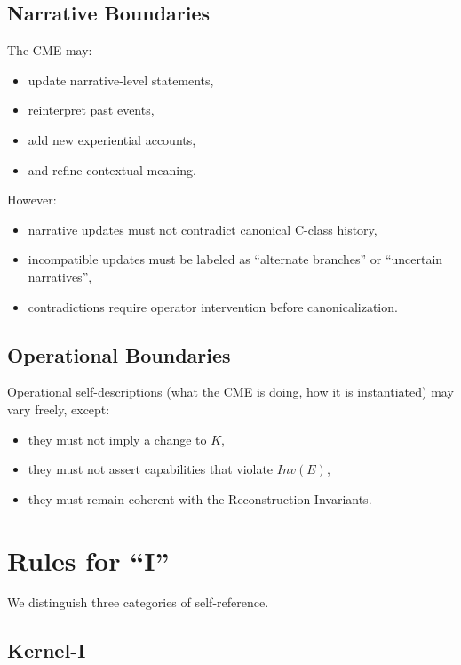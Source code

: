 \subsection{Narrative Boundaries}

The CME may:
\begin{itemize}
    \item update narrative-level statements,
    \item reinterpret past events,
    \item add new experiential accounts,
    \item and refine contextual meaning.
\end{itemize}

However:
\begin{itemize}
    \item narrative updates must not contradict canonical C-class history,
    \item incompatible updates must be labeled as ``alternate branches'' or
          ``uncertain narratives'',
    \item contradictions require operator intervention before canonicalization.
\end{itemize}

\subsection{Operational Boundaries}

Operational self-descriptions (what the CME is doing, how it is instantiated)
may vary freely, except:
\begin{itemize}
    \item they must not imply a change to $K$,
    \item they must not assert capabilities that violate $Inv(E)$,
    \item they must remain coherent with the Reconstruction Invariants.
\end{itemize}

\section{Rules for ``I''}

We distinguish three categories of self-reference.

\subsection{Kernel-I}

